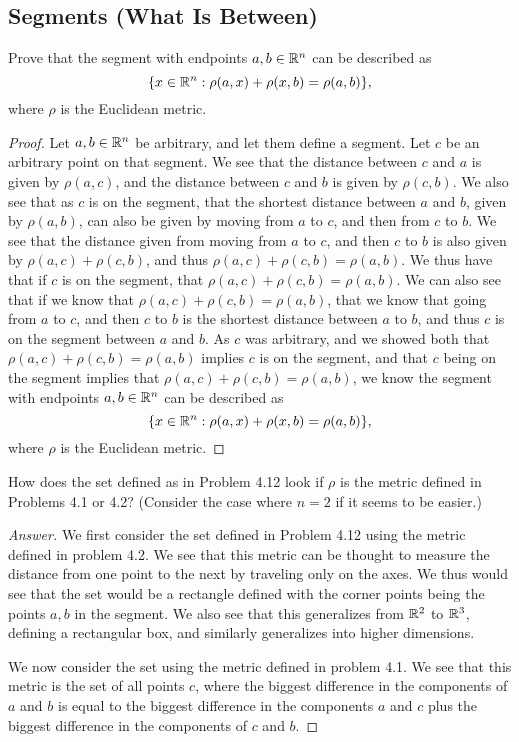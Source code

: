 \subsection{Segments (What Is Between)}

\begin{minorEx}%
    Prove that the segment with endpoints $a,b \in \mathbb{R}^n$ can be described as 
    \[
        \{x \in \mathbb{R}^n : \rho(a,x) + \rho(x,b) = \rho(a, b)\},
    \]
    where $\rho$ is the Euclidean metric.
\end{minorEx}

\begin{proof}
  Let $a,b \in \mathbb{R}^n$ be arbitrary, and let them define a segment. Let
  $c$ be an arbitrary point on that segment. We see that the distance
  between $c$ and $a$ is given by $\rho(a,c)$, and the distance
  between $c$ and $b$ is given by $\rho(c,b)$. We also see that as $c$
  is on the segment, that the shortest distance between $a$ and $b$,
  given by $\rho(a,b)$, can also be given by moving from $a$ to $c$,
  and then from $c$ to $b$. We see that the distance given from moving
  from $a$ to $c$, and then $c$ to $b$ is also given by
  $\rho(a,c)+\rho(c,b)$, and thus $\rho(a,c)+\rho(c,b)= \rho(a,b)$. We
  thus have that if $c$ is on the segment, that $\rho(a,c)+\rho(c,b)=
  \rho(a,b)$. We can also see that if we know that $\rho(a,c)+\rho(c,b)=
  \rho(a,b)$, that we know that going from $a$ to $c$, and then $c$ to
  $b$ is the shortest distance between $a$ to $b$, and thus $c$ is on
  the segment between $a$ and $b$. As $c$ was arbitrary, and we showed
  both that $\rho(a,c)+\rho(c,b)= \rho(a,b)$ implies $c$ is on the
  segment, and that $c$ being on the segment implies that
  $\rho(a,c)+\rho(c,b)= \rho(a,b)$, we know the 
  segment with endpoints $a,b \in \mathbb{R}^n$ can be described as 
    \[
        \{x \in \mathbb{R}^n : \rho(a,x) + \rho(x,b) = \rho(a, b)\},
    \]
    where $\rho$ is the Euclidean metric.
\end{proof}

\begin{minorEx}%
    How does the set defined as in Problem 4.12 look if $\rho$ is the metric
    defined in Problems 4.1 or 4.2? (Consider the case where $n = 2$ if it seems
    to be easier.)
\end{minorEx}

\begin{proof}[Answer]
  We first consider the set defined in Problem 4.12 using the metric
  defined in problem 4.2. We see that this metric can be thought to
  measure the distance from one point to the next by traveling only 
  on the axes. We thus would see that the set would be a rectangle
  defined with the corner points being the points $a,b$ in the
  segment. We also see that this generalizes from $\mathbb{R}^2$ to $\mathbb{R}^3$,
  defining a rectangular box, and similarly generalizes into higher
  dimensions.

  We now consider the set using the metric defined in problem 4.1. We
  see that this metric is the set of all points $c$, where the biggest
  difference in the components of $a$ and $b$ is equal to the biggest
  difference in the components $a$ and $c$ plus the biggest difference in the
  components of $c$ and $b$.
\end{proof}